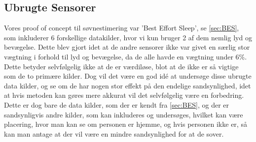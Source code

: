 \subsection{Ubrugte Sensorer}
Vores proof of concept til søvnestimering var 'Best Effort Sleep', se \cref{sec:BES}, som inkluderer 6 forskellige datakilder, hvor vi kun bruger 2 af dem nemlig lyd og bevægelse. 
Dette blev gjort idet at de andre sensorer ikke var givet en særlig stor vægtning i forhold til lyd og bevægelse, da de alle havde en vægtning under 6\%. 
Dette betyder selvfølgelig ikke at de er værdiløse, blot at de ikke er så vigtige som de to primære kilder.
Dog vil det være en god idé at undersøge disse ubrugte data kilder, og se om de har nogen stor effekt på den endelige sandsynlighed, idet at hvis metoden kan gøres mere akkurat vil det selvfølgelig være en forbedring. 
Dette er dog bare de data kilder, som der er kendt fra \cref{sec:BES}, og der er sandsynligvis andre kilder, som kan inkluderes og undersøges, hvilket kan være placering, hvor man kan se om personen er hjemme, og hvis personen ikke er, så kan man antage at der vil være en mindre sandsynlighed for at de sover. 